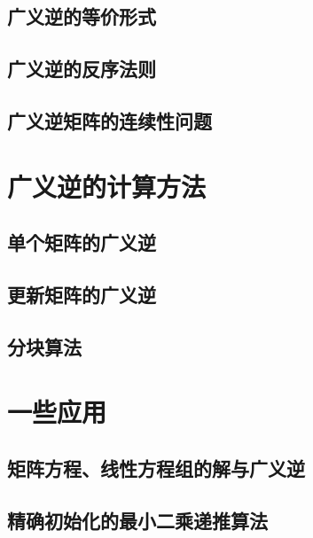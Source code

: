 \subsection{广义逆的等价形式}
\label{sub:广义逆的等价形式}

\begin{definition}
\end{definition}

\subsection{广义逆的反序法则}
\label{sub:广义逆的反序法则}

\subsection{广义逆矩阵的连续性问题}
\label{sub:广义逆矩阵的连续性问题}

\section{广义逆的计算方法}
\label{sec:广义逆的计算方法}

\subsection{单个矩阵的广义逆}
\label{sub:单个矩阵的广义逆}

\subsection{更新矩阵的广义逆}
\label{sub:更新矩阵的广义逆}

\subsection{分块算法}
\label{sub:分块算法}

\section{一些应用}
\label{sec:一些应用}

\subsection{矩阵方程、线性方程组的解与广义逆}
\label{sub:矩阵方程、线性方程组的解与广义逆}

\subsection{精确初始化的最小二乘递推算法}
\label{sub:精确初始化的最小二乘递推算法}

